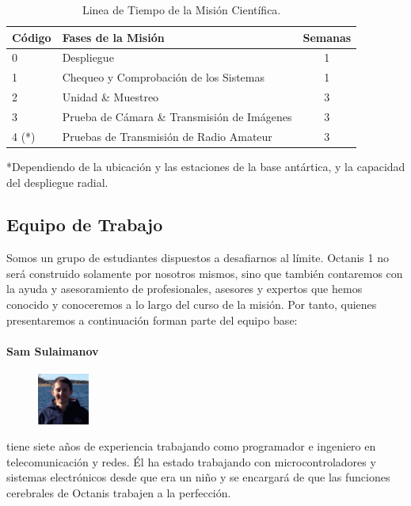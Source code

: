 \documentclass[a4paper,12pt]{article}
\begin{document}
\begin{table}[h!]
\centering
\begin{tabular}{ l | l | c }
\bfseries{Código} & \bfseries{Fases de la Misión} & \bfseries{Semanas} \\
\hline

0 & Despliegue & 1 \\
1 & Chequeo y Comprobación de los Sistemas & 1 \\
2 & Unidad \& Muestreo & 3 \\
3 & Prueba de Cámara \& Transmisión de Imágenes  & 3 \\
4 (*)& Pruebas de Transmisión de Radio Amateur  & 3 \\

\end{tabular}
\caption{Linea de Tiempo de la Misión Científica.}
*Dependiendo de la ubicación y las estaciones de la base antártica, y la capacidad del despliegue radial.

\end{table}

\pagebreak

\subsection{Equipo de Trabajo}

Somos un grupo de estudiantes dispuestos a desafiarnos al límite. Octanis 1 no será construido solamente por nosotros mismos, sino que también contaremos con la ayuda y asesoramiento de profesionales, asesores y expertos que hemos conocido y conoceremos a lo largo del curso de la misión. Por tanto, quienes presentaremos a continuación forman parte  del equipo base:


\paragraph{Sam Sulaimanov} 
\begin{figure}
    \centering
    \vspace{-13pt}
    \includegraphics[width=0.15\textwidth]{sam}
\end{figure} tiene siete años de experiencia trabajando como programador e ingeniero en telecomunicación y redes. Él ha estado trabajando con microcontroladores y sistemas electrónicos desde que era un niño y se encargará de que las funciones cerebrales de Octanis trabajen a la perfección.
\\ \\
\end{document}
